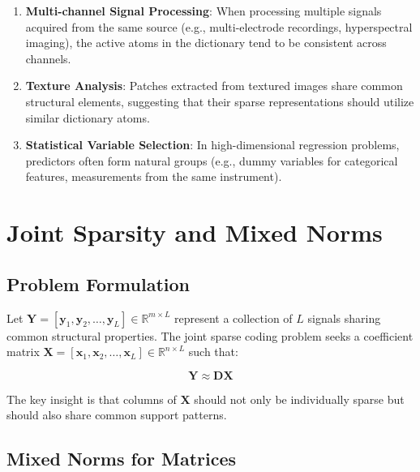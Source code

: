 \documentclass[12pt]{article}
\renewcommand{\vec}[1]{\mathbf{#1}}
\theoremstyle{definition}
\begin{document}
\begin{enumerate}[label=(\alph*)]
    \item \textbf{Multi-channel Signal Processing}: When processing multiple signals acquired from the same source (e.g., multi-electrode recordings, hyperspectral imaging), the active atoms in the dictionary tend to be consistent across channels.

    \item \textbf{Texture Analysis}: Patches extracted from textured images share common structural elements, suggesting that their sparse representations should utilize similar dictionary atoms.

    \item \textbf{Statistical Variable Selection}: In high-dimensional regression problems, predictors often form natural groups (e.g., dummy variables for categorical features, measurements from the same instrument).
\end{enumerate}

\newpage

\section{Joint Sparsity and Mixed Norms}

\subsection{Problem Formulation}

Let $\vec{Y} = [\vec{y}_1, \vec{y}_2, \ldots, \vec{y}_L] \in \mathbb{R}^{m \times L}$ represent a collection of $L$ signals sharing common structural properties. The joint sparse coding problem seeks a coefficient matrix $\vec{X} = [\vec{x}_1, \vec{x}_2, \ldots, \vec{x}_L] \in \mathbb{R}^{n \times L}$ such that:

\begin{equation}
    \vec{Y} \approx \vec{D}\vec{X}
    \label{eq:joint_approx}
\end{equation}

The key insight is that columns of $\vec{X}$ should not only be individually sparse but should also share common support patterns.

\subsection{Mixed Norms for Matrices}
\end{document}
